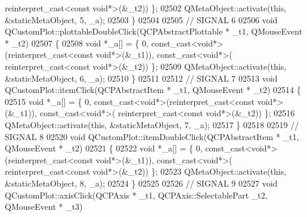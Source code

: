 \begin{DoxyCode}
{      reinterpret\_cast<}\textcolor{keyword}{const }\textcolor{keywordtype}{void}*\textcolor{keyword}{>}(&\_t2)) \};
02502     QMetaObject::activate(\textcolor{keyword}{this}, &staticMetaObject, 5, \_a);
02503 \}
02504 
02505 \textcolor{comment}{// SIGNAL 6}
02506 \textcolor{keywordtype}{void} QCustomPlot::plottableDoubleClick(QCPAbstractPlottable * \_t1, QMouseEvent * \_t2)
02507 \{
02508     \textcolor{keywordtype}{void} *\_a[] = \{ 0, \textcolor{keyword}{const\_cast<}\textcolor{keywordtype}{void}*\textcolor{keyword}{>}(\textcolor{keyword}{reinterpret\_cast<}\textcolor{keyword}{const }\textcolor{keywordtype}{void}*\textcolor{keyword}{>}(&\_t1)), \textcolor{keyword}{const\_cast<}\textcolor{keywordtype}{void}*\textcolor{keyword}{>}(\textcolor{keyword}{
      reinterpret\_cast<}\textcolor{keyword}{const }\textcolor{keywordtype}{void}*\textcolor{keyword}{>}(&\_t2)) \};
02509     QMetaObject::activate(\textcolor{keyword}{this}, &staticMetaObject, 6, \_a);
02510 \}
02511 
02512 \textcolor{comment}{// SIGNAL 7}
02513 \textcolor{keywordtype}{void} QCustomPlot::itemClick(QCPAbstractItem * \_t1, QMouseEvent * \_t2)
02514 \{
02515     \textcolor{keywordtype}{void} *\_a[] = \{ 0, \textcolor{keyword}{const\_cast<}\textcolor{keywordtype}{void}*\textcolor{keyword}{>}(\textcolor{keyword}{reinterpret\_cast<}\textcolor{keyword}{const }\textcolor{keywordtype}{void}*\textcolor{keyword}{>}(&\_t1)), \textcolor{keyword}{const\_cast<}\textcolor{keywordtype}{void}*\textcolor{keyword}{>}(\textcolor{keyword}{
      reinterpret\_cast<}\textcolor{keyword}{const }\textcolor{keywordtype}{void}*\textcolor{keyword}{>}(&\_t2)) \};
02516     QMetaObject::activate(\textcolor{keyword}{this}, &staticMetaObject, 7, \_a);
02517 \}
02518 
02519 \textcolor{comment}{// SIGNAL 8}
02520 \textcolor{keywordtype}{void} QCustomPlot::itemDoubleClick(QCPAbstractItem * \_t1, QMouseEvent * \_t2)
02521 \{
02522     \textcolor{keywordtype}{void} *\_a[] = \{ 0, \textcolor{keyword}{const\_cast<}\textcolor{keywordtype}{void}*\textcolor{keyword}{>}(\textcolor{keyword}{reinterpret\_cast<}\textcolor{keyword}{const }\textcolor{keywordtype}{void}*\textcolor{keyword}{>}(&\_t1)), \textcolor{keyword}{const\_cast<}\textcolor{keywordtype}{void}*\textcolor{keyword}{>}(\textcolor{keyword}{
      reinterpret\_cast<}\textcolor{keyword}{const }\textcolor{keywordtype}{void}*\textcolor{keyword}{>}(&\_t2)) \};
02523     QMetaObject::activate(\textcolor{keyword}{this}, &staticMetaObject, 8, \_a);
02524 \}
02525 
02526 \textcolor{comment}{// SIGNAL 9}
02527 \textcolor{keywordtype}{void} QCustomPlot::axisClick(QCPAxis * \_t1, QCPAxis::SelectablePart \_t2, QMouseEvent * \_t3)

\end{DoxyCode}
